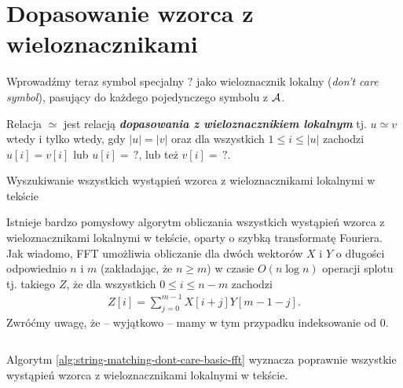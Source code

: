 \section{Dopasowanie wzorca z wieloznacznikami}

Wprowadźmy teraz symbol specjalny $?$ jako wieloznacznik lokalny (\emph{don't care symbol}), pasujący do każdego pojedynczego symbolu z $\operatorname{\mathcal{A}}$.

\begin{definition}{}{}
  Relacja $\simeq$ jest relacją {\bf\textit{dopasowania z wieloznacznikiem lokalnym}} tj. $u \simeq v$ wtedy i tylko wtedy, gdy $|u| = |v|$ oraz dla wszystkich $1 \le i \le |u|$ zachodzi $u[i] = v[i]$ lub $u[i] =\,?$, lub też $v[i] =\,?$.
\end{definition}

\begin{algorithm}[H]
    \caption{Wyszukiwanie wszystkich wystąpień wzorca z wieloznacznikami lokalnymi w tekście}
\end{algorithm}

Istnieje bardzo pomysłowy algorytm obliczania wszystkich wystąpień wzorca z wieloznacznikami lokalnymi w tekście, oparty o szybką transformatę Fouriera.
Jak wiadomo, FFT umożliwia obliczanie dla dwóch wektorów $X$ i $Y$ o długości odpowiednio $n$ i $m$ (zakładając, że $n \ge m$) w czasie $O(n \log{n})$ operacji splotu tj. takiego $Z$, że dla wszystkich $0 \le i \le n - m$ zachodzi
\begin{align*}
  Z[i] = \sum_{j = 0}^{m - 1} X[i + j] Y[m - 1 - j].
\end{align*}
Zwróćmy uwagę, że -- wyjątkowo -- mamy w tym przypadku indeksowanie od $0$.

\begin{code}
\inputminted{python}{code/approximate-string-matching/basic-fft.py}
\label{alg:string-matching-dont-care-basic-fft}
\end{code}

\begin{theorem}{}{}
  Algorytm \ref{alg:string-matching-dont-care-basic-fft} wyznacza poprawnie wszystkie wystąpień wzorca z wieloznacznikami lokalnymi w tekście.
\end{theorem}

